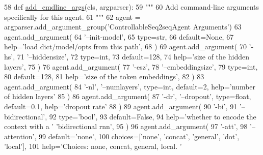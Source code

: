 \begin{DoxyCode}
58     \textcolor{keyword}{def }\hyperlink{namespaceparlai_1_1agents_1_1drqa_1_1config_a62fdd5554f1da6be0cba185271058320}{add\_cmdline\_args}(cls, argparser):
59         \textcolor{stringliteral}{"""}
60 \textcolor{stringliteral}{        Add command-line arguments specifically for this agent.}
61 \textcolor{stringliteral}{        """}
62         agent = argparser.add\_argument\_group(\textcolor{stringliteral}{'ControllableSeq2seqAgent Arguments'})
63         agent.add\_argument(
64             \textcolor{stringliteral}{'--init-model'},
65             type=str,
66             default=\textcolor{keywordtype}{None},
67             help=\textcolor{stringliteral}{'load dict/model/opts from this path'},
68         )
69         agent.add\_argument(
70             \textcolor{stringliteral}{'-hs'},
71             \textcolor{stringliteral}{'--hiddensize'},
72             type=int,
73             default=128,
74             help=\textcolor{stringliteral}{'size of the hidden layers'},
75         )
76         agent.add\_argument(
77             \textcolor{stringliteral}{'-esz'},
78             \textcolor{stringliteral}{'--embeddingsize'},
79             type=int,
80             default=128,
81             help=\textcolor{stringliteral}{'size of the token embeddings'},
82         )
83         agent.add\_argument(
84             \textcolor{stringliteral}{'-nl'}, \textcolor{stringliteral}{'--numlayers'}, type=int, default=2, help=\textcolor{stringliteral}{'number of hidden layers'}
85         )
86         agent.add\_argument(
87             \textcolor{stringliteral}{'-dr'}, \textcolor{stringliteral}{'--dropout'}, type=float, default=0.1, help=\textcolor{stringliteral}{'dropout rate'}
88         )
89         agent.add\_argument(
90             \textcolor{stringliteral}{'-bi'},
91             \textcolor{stringliteral}{'--bidirectional'},
92             type=\textcolor{stringliteral}{'bool'},
93             default=\textcolor{keyword}{False},
94             help=\textcolor{stringliteral}{'whether to encode the context with a '} \textcolor{stringliteral}{'bidirectional rnn'},
95         )
96         agent.add\_argument(
97             \textcolor{stringliteral}{'-att'},
98             \textcolor{stringliteral}{'--attention'},
99             default=\textcolor{stringliteral}{'none'},
100             choices=[\textcolor{stringliteral}{'none'}, \textcolor{stringliteral}{'concat'}, \textcolor{stringliteral}{'general'}, \textcolor{stringliteral}{'dot'}, \textcolor{stringliteral}{'local'}],
101             help=\textcolor{stringliteral}{'Choices: none, concat, general, local. '}

\end{DoxyCode}
